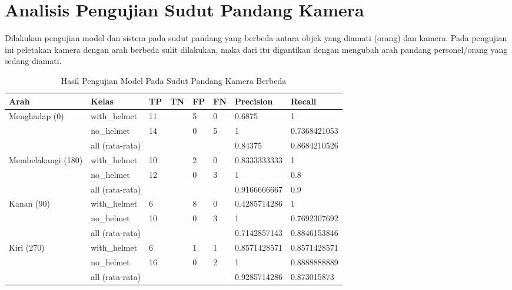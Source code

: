 \section{Analisis Pengujian Sudut Pandang Kamera}
\label{sec:analisis_sudutkamera}

\par Dilakukan pengujian model dan sistem pada sudut pandang yang berbeda antara objek yang diamati (orang) dan kamera. Pada pengujian ini peletakan kamera dengan arah berbeda sulit dilakukan, maka dari itu digantikan dengan mengubah arah pandang personel/orang yang sedang diamati. 

\begin{table}
    \centering
    \caption{Hasil Pengujian Model Pada Sudut Pandang Kamera Berbeda}
    \label{tb:analisis_model_diffarah}
    \begin{tabular}{|l|l|l|l|l|l|l|l|} 
    \hline
    Arah                                & Kelas           & TP & TN & FP & FN & Precision    & Recall        \\ 
    \hline
    \multirow{3}{*}{Menghadap (0)}      & with\_helmet    & 11 &    & 5  & 0  & 0.6875       & 1             \\ 
    \cline{2-8}
                                        & no\_helmet      & 14 &    & 0  & 5  & 1            & 0.7368421053  \\ 
    \cline{2-8}
                                        & all (rata-rata) &    &    &    &    & 0.84375      & 0.8684210526  \\ 
    \hline
    \multirow{3}{*}{Membelakangi (180)} & with\_helmet    & 10 &    & 2  & 0  & 0.8333333333 & 1             \\ 
    \cline{2-8}
                                        & no\_helmet      & 12 &    & 0  & 3  & 1            & 0.8           \\ 
    \cline{2-8}
                                        & all (rata-rata) &    &    &    &    & 0.9166666667 & 0.9           \\ 
    \hline
    \multirow{3}{*}{Kanan (90)}         & with\_helmet    & 6  &    & 8  & 0  & 0.4285714286 & 1             \\ 
    \cline{2-8}
                                        & no\_helmet      & 10 &    & 0  & 3  & 1            & 0.7692307692  \\ 
    \cline{2-8}
                                        & all (rata-rata) &    &    &    &    & 0.7142857143 & 0.8846153846  \\ 
    \hline
    \multirow{3}{*}{Kiri (270)}         & with\_helmet    & 6  &    & 1  & 1  & 0.8571428571 & 0.8571428571  \\ 
    \cline{2-8}
                                        & no\_helmet      & 16 &    & 0  & 2  & 1            & 0.8888888889  \\ 
    \cline{2-8}
                                        & all (rata-rata) &    &    &    &    & 0.9285714286 & 0.873015873   \\
    \hline
    \end{tabular}
\end{table}

